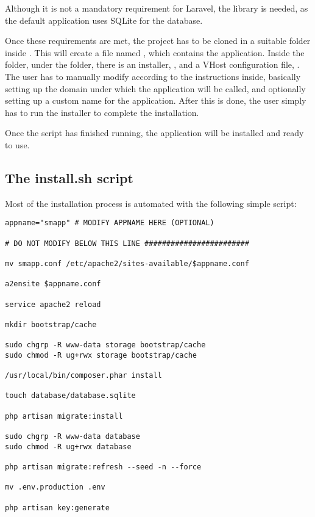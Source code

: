 Although it is not a mandatory requirement for Laravel, the  library is needed, as the default application uses SQLite for the database.

Once these requirements are met, the project has to be cloned in a suitable folder inside . This will create a file named , which contains the application. Inside the folder, under the  folder, there is an installer, , and a VHost configuration file, . The user has to manually modify  according to the instructions inside, basically setting up the domain under which the application will be called, and optionally setting up a custom name for the application. After this is done, the user simply has to run the installer to complete the installation.

Once the script has finished running, the application will be installed and ready to use.

\subsection{The install.sh script}
Most of the installation process is automated with the following simple script:

\begin{verbatim}
appname="smapp" # MODIFY APPNAME HERE (OPTIONAL)

# DO NOT MODIFY BELOW THIS LINE ########################

mv smapp.conf /etc/apache2/sites-available/$appname.conf

a2ensite $appname.conf

service apache2 reload

mkdir bootstrap/cache

sudo chgrp -R www-data storage bootstrap/cache
sudo chmod -R ug+rwx storage bootstrap/cache

/usr/local/bin/composer.phar install

touch database/database.sqlite

php artisan migrate:install

sudo chgrp -R www-data database
sudo chmod -R ug+rwx database

php artisan migrate:refresh --seed -n --force

mv .env.production .env

php artisan key:generate
\end{verbatim}

